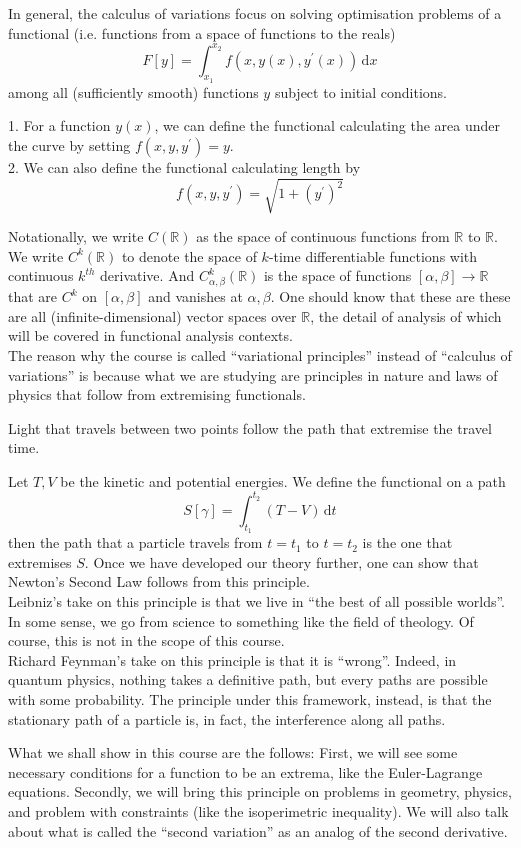 \documentclass{article}
\begin{document}
In general, the calculus of variations focus on solving optimisation problems of a functional (i.e. functions from a space of functions to the reals)
$$F[y]=\int_{x_1}^{x_2}f(x,y(x),y^\prime(x))\,\mathrm dx$$
among all (sufficiently smooth) functions $y$ subject to initial conditions.
\begin{example}
    1. For a function $y(x)$, we can define the functional calculating the area under the curve by setting $f(x,y,y^\prime)=y$.\\
    2. We can also define the functional calculating length by
    $$f(x,y,y^\prime)=\sqrt{1+(y^\prime)^2}$$
\end{example}
Notationally, we write $C(\mathbb R)$ as the space of continuous functions from $\mathbb R$ to $\mathbb R$.
We write $C^k(\mathbb R)$ to denote the space of $k$-time differentiable functions with continuous $k^{th}$ derivative.
And $C^k_{\alpha,\beta}(\mathbb R)$ is the space of functions $[\alpha,\beta]\to\mathbb R$ that are $C^k$ on $[\alpha,\beta]$ and vanishes at $\alpha,\beta$.
One should know that these are these are all (infinite-dimensional) vector spaces over $\mathbb R$, the detail of analysis of which will be covered in functional analysis contexts.\\
The reason why the course is called ``variational principles'' instead of ``calculus of variations'' is because what we are studying are principles in nature and laws of physics that follow from extremising functionals.
\begin{example}
    Light that travels between two points follow the path that extremise the travel time.
\end{example}
\begin{example}
    Let $T,V$ be the kinetic and potential energies.
    We define the functional on a path
    $$S[\gamma]=\int_{t_1}^{t_2}(T-V)\,\mathrm dt$$
    then the path that a particle travels from $t=t_1$ to $t=t_2$ is the one that extremises $S$.
    Once we have developed our theory further, one can show that Newton's Second Law follows from this principle.\\
    Leibniz's take on this principle is that we live in ``the best of all possible worlds''.
    In some sense, we go from science to something like the field of theology.
    Of course, this is not in the scope of this course.\\
    Richard Feynman's take on this principle is that it is ``wrong''.
    Indeed, in quantum physics, nothing takes a definitive path, but every paths are possible with some probability.
    The principle under this framework, instead, is that the stationary path of a particle is, in fact, the interference along all paths.
\end{example}
What we shall show in this course are the follows:
First, we will see some necessary conditions for a function to be an extrema, like the Euler-Lagrange equations.
Secondly, we will bring this principle on problems in geometry, physics, and problem with constraints (like the isoperimetric inequality).
We will also talk about what is called the ``second variation'' as an analog of the second derivative.
\newpage
\end{document}
